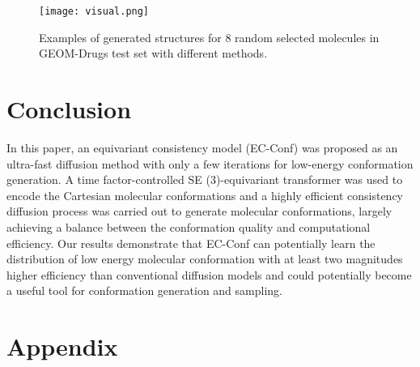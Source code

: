 \documentclass{article} %
\begin{document}
\begin{figure*}[htbp]
	\centering
	\centerline{\texttt{[image: visual.png]}}
	\caption{Examples of generated structures for 8 random selected molecules in GEOM-Drugs test set with different methods.}
	\label{fig4}
\end{figure*}


\section{Conclusion}
In this paper, an equivariant consistency model (EC-Conf) was proposed as an ultra-fast diffusion method with only a few iterations for low-energy conformation generation. A time factor-controlled SE (3)-equivariant transformer was used to encode the Cartesian molecular conformations and a highly efficient consistency diffusion process was carried out to generate molecular conformations, largely achieving a balance between the conformation quality and computational efficiency. Our results demonstrate that EC-Conf can potentially learn the distribution of low energy molecular conformation with at least two magnitudes higher efficiency than conventional diffusion models and could potentially become a useful tool for conformation generation and sampling.








\appendix
\section{Appendix} 
\label{app1}
\end{document}
